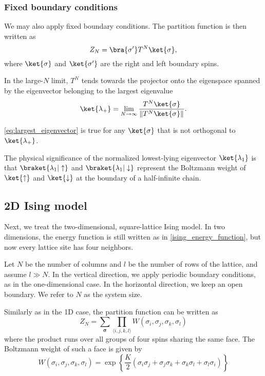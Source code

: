 \subsubsection{Fixed boundary conditions}\label{sec:fixed_boundary_conditions}
We may also apply fixed boundary conditions. The partition function is then written as
\begin{equation}
  Z_N = \bra{\sigma'}T^N\ket{\sigma},
\end{equation}
where $\ket{\sigma}$ and $\ket{\sigma'}$ are the right and left boundary spins.

In the large-$N$ limit, $T^N$ tends towards the projector onto the eigenspace spanned by
the eigenvector belonging to the largest eigenvalue
\begin{equation}\label{eq:largest_eigenvector}
  \ket{\lambda_+} = \lim_{N \to \infty} \frac{T^N \ket{\sigma}}{\left\lVert T^N \ket{\sigma} \right\rVert}.
\end{equation}

\autoref{eq:largest_eigenvector} is true for any $\ket{\sigma}$ that is not orthogonal to $\ket{\lambda_+}$.

The physical significance of the normalized lowest-lying eigenvector $\ket{\lambda_1}$ is
that
$\braket{\lambda_1 | \uparrow}$ and
$\braket{\lambda_1 | \downarrow}$ represent the Boltzmann weight of $\ket{\uparrow}$ and
$\ket{\downarrow}$ at the boundary of a half-infinite chain.

\subsection{2D Ising model}

Next, we treat the two-dimensional, square-lattice Ising model. In two
dimensions, the energy function is still written as in
\autoref{ising_energy_function}, but now every lattice site has four neighbors.

Let $N$ be the number of columns and $l$ be the number of rows of the lattice, and assume
$l \gg N$. In the vertical direction, we apply periodic boundary conditions, as in the
one-dimensional case. In the horizontal direction, we keep an open boundary. We refer to
$N$ as the system size. 

Similarly as in the 1D case, the partition function can be written as
\begin{equation}
  Z_N = \sum_{\bm{\sigma}} \prod_{\langle i, j, k, l \rangle} W(\sigma_i, \sigma_j, \sigma_k, \sigma_l)
\end{equation}
where the product runs over all groups of four spins sharing the same face. The Boltzmann weight of such a face is given by
\begin{equation}\label{eq:boltzmann_weight_face_ising_model}
  W(\sigma_i, \sigma_j, \sigma_k, \sigma_l) = \exp \left\{ \frac{K}{2} (\sigma_i \sigma_j + \sigma_j \sigma_k + \sigma_k \sigma_l + \sigma_l \sigma_i) \right\}
\end{equation}

